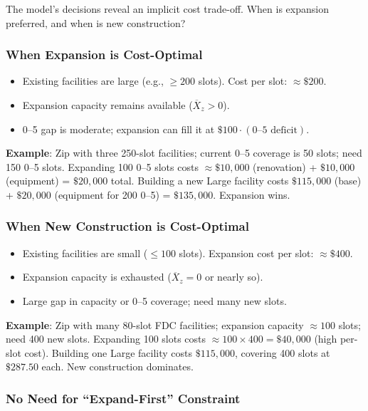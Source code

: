 \documentclass[12pt]{article}
\begin{document}
The model's decisions reveal an implicit cost trade-off. When is expansion preferred, and when is new construction?

\subsubsection{When Expansion is Cost-Optimal}

\begin{itemize}
    \item Existing facilities are large (e.g., $\geq 200$ slots). Cost per slot: $\approx \$200$.
    \item Expansion capacity remains available ($\overline{X}_z > 0$).
    \item 0--5 gap is moderate; expansion can fill it at $\$100 \cdot (\text{0--5 deficit})$.
\end{itemize}

\noindent
\textbf{Example}: Zip with three 250-slot facilities; current 0--5 coverage is 50 slots; need 150 0--5 slots.
Expanding 100 0--5 slots costs $\approx \$10{,}000$ (renovation) + $\$10{,}000$ (equipment) = $\$20{,}000$ total.
Building a new Large facility costs $\$115{,}000$ (base) + $\$20{,}000$ (equipment for 200 0--5) = $\$135{,}000$.
Expansion wins.

\subsubsection{When New Construction is Cost-Optimal}

\begin{itemize}
    \item Existing facilities are small ($\leq 100$ slots). Expansion cost per slot: $\approx \$400$.
    \item Expansion capacity is exhausted ($\overline{X}_z = 0$ or nearly so).
    \item Large gap in capacity or 0--5 coverage; need many new slots.
\end{itemize}

\noindent
\textbf{Example}: Zip with many 80-slot FDC facilities; expansion capacity $\approx 100$ slots; need 400 new slots.
Expanding 100 slots costs $\approx 100 \times 400 = \$40{,}000$ (high per-slot cost). Building one Large facility costs 
$\$115{,}000$, covering 400 slots at $\$287.50$ each. New construction dominates.

\subsubsection{No Need for ``Expand-First'' Constraint}
\end{document}
